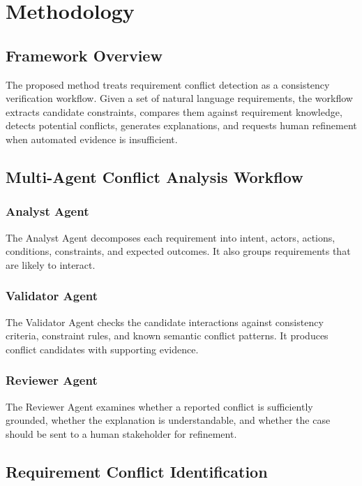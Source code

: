 \section{Methodology}
\label{methodology}

\subsection{Framework Overview}
The proposed method treats requirement conflict detection as a consistency
verification workflow. Given a set of natural language requirements, the workflow
extracts candidate constraints, compares them against requirement knowledge, detects
potential conflicts, generates explanations, and requests human refinement when
automated evidence is insufficient.

\subsection{Multi-Agent Conflict Analysis Workflow}

\subsubsection{Analyst Agent}
The Analyst Agent decomposes each requirement into intent, actors, actions,
conditions, constraints, and expected outcomes. It also groups requirements that are
likely to interact.

\subsubsection{Validator Agent}
The Validator Agent checks the candidate interactions against consistency criteria,
constraint rules, and known semantic conflict patterns. It produces conflict
candidates with supporting evidence.

\subsubsection{Reviewer Agent}
The Reviewer Agent examines whether a reported conflict is sufficiently grounded,
whether the explanation is understandable, and whether the case should be sent to a
human stakeholder for refinement.

\subsection{Requirement Conflict Identification}

